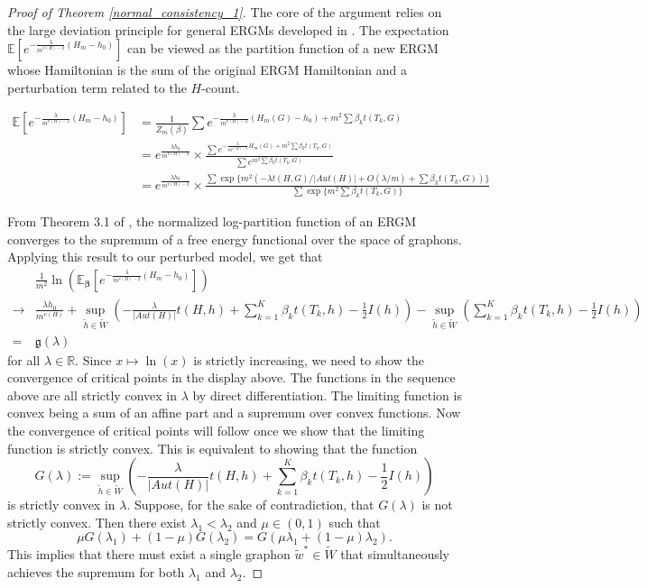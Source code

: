 \documentclass[12pt]{article}
\def\E{\mathbb{E}}
\numberwithin{equation}{section}
\def\bbeta{\boldsymbol{\beta}}
\begin{document}
\begin{proof}[Proof of Theorem \ref{normal_consistency_1}]
The core of the argument relies on the large deviation principle for general ERGMs developed in \cite{chatterjee2013estimating}. The expectation $\E[e^{-\frac{\lambda}{m^{v(H)-2}}(H_m-h_0)}]$ can be viewed as the partition function of a new ERGM whose Hamiltonian is the sum of the original ERGM Hamiltonian and a perturbation term related to the $H$-count.

\begin{align*}
\E\left[e^{-\frac{\lambda}{m^{v(H)-2}}(H_m-h_0)}\right] &= 
\frac{1}{Z_m(\beta)}\sum e^{-\frac{\lambda}{m^{v(H)-2}}(H_m(G)-h_0) + m^2\sum \beta_kt(T_k,G)}\\
&= e^{\frac{\lambda h_0}{m^{v(H)-2}}}\times\frac{\sum e^{-\frac{\lambda}{m^{v(H)-2}}H_m(G) + m^2\sum \beta_kt(T_k,G)}}{\sum e^{m^2\sum \beta_kt(T_k,G)}}\\
&= e^{\frac{\lambda h_0}{m^{v(H)-2}}}\times\frac{\sum \exp\{m^2(-\lambda t(H,G)/\lvert Aut(H)\rvert + O(\lambda/m) + \sum \beta_kt(T_k,G))\}}{\sum \exp\{m^2\sum \beta_kt(T_k,G)\}}
\end{align*}

From Theorem 3.1 of \cite{chatterjee2013estimating}, the normalized log-partition function of an ERGM converges to the supremum of a free energy functional over the space of graphons. Applying this result to our perturbed model, we get that
\begin{align}
&\frac{1}{m^2}\ln \left(\E_{\bbeta}\left[e^{-\frac{\lambda}{m^{v(H)-2}}(H_m-h_0)}\right]\right)\nonumber\\
\to & \frac{\lambda h_0}{m^{v(H)}} + \sup_{\tilde{h}\in\tilde{W}}\left(-\frac{\lambda}{|Aut(H)|} t(H,h) + \sum_{k=1}^K \beta_k t(T_k, h) - \frac{1}{2}I(h) \right) - \sup_{\tilde{h}\in\tilde{W}}\left(\sum_{k=1}^K \beta_k t(T_k, h) - \frac{1}{2}I(h) \right)\nonumber\\
=& \mathfrak{g}(\lambda)\label{var_formula}
\end{align}
for all $\lambda \in \mathbb{R}$.
Since $x\mapsto \ln(x)$ is strictly increasing, we need to show the convergence of critical points in the display above. The functions in the sequence above are all strictly convex in $\lambda$ by direct differentiation. The limiting function is convex being a sum of an affine part and a supremum over convex functions. Now the convergence of critical points will follow once we show that the limiting function is strictly convex. This is equivalent to showing that the function
\[
G(\lambda) := \sup_{\tilde{h}\in\tilde{W}}\left(-\frac{\lambda}{|Aut(H)|} t(H,h) + \sum_{k=1}^K \beta_k t(T_k, h) - \frac{1}{2}I(h) \right)
\]
is strictly convex in $\lambda$. Suppose, for the sake of contradiction, that $G(\lambda)$ is not strictly convex. Then there exist $\lambda_1 < \lambda_2$ and $\mu \in (0,1)$ such that
\[
\mu G(\lambda_1) + (1-\mu) G(\lambda_2) = G(\mu \lambda_1 + (1-\mu)\lambda_2).
\]
This implies that there must exist a single graphon $\tilde{w}^* \in \tilde{W}$ that simultaneously achieves the supremum for both \(\lambda_1\) and \(\lambda_2\).


\end{proof}
\end{document}
